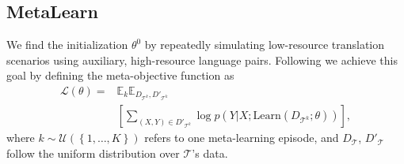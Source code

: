 \begin{figure}[hptb]
\end{figure}

\subsection{MetaLearn}
\label{sec:ml}

We find the initialization $\theta^0$ by repeatedly simulating low-resource translation scenarios using auxiliary, high-resource language pairs. Following \citet{finn2017model} 
we achieve this goal by defining the meta-objective function as
\begin{align}
\label{eq:meta}
    \mathcal{L}(\theta) =& 
    \mathbb{E}_{k} \mathbb{E}_{D_{\mathcal{T}^{k}}, D'_{\mathcal{T}^{k}}} \\
    &\left[
    \sum_{(X,Y) \in D'_{\mathcal{T}^{k}}} \!\!\!\!\!\!\!
    \log p(Y|X; \text{Learn}(D_{\mathcal{T}^{k}}; \theta))
    \right], \nonumber
\end{align}
where $k \!\sim\!\mathcal{U}(\left\{1, \ldots, K \right\})$ refers to one meta-learning episode, and $D_{\mathcal{T}}$,  $D'_{\mathcal{T}}$ follow the uniform distribution over $\mathcal{T}$'s data.  

